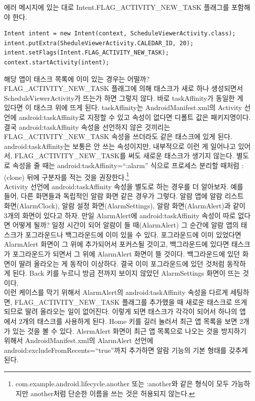 에러 메시지에 있는 대로 Intent.FLAG\_ACTIVITY\_NEW\_TASK 플래그를 포함해야 한다.
\begin{lstlisting}[frame=single]
Intent intent = new Intent(context, ScheduleViewerActivity.class);
intent.putExtra(SheduleViewerActivity.CALEDAR_ID, 20);
intent.setFlags(Intent.FLAG_ACTIVITY_NEW_TASK);
context.startActivity(intent);
\end{lstlisting}

해당 앱이 태스크 목록에 이미 있는 경우는 어떨까? FLAG\_ACTIVITY\_NEW\_TASK 플래그에 의해 태스크가 새로 하나 생성되면서 ScheduleViewerActivity가 뜨는가 하면 그렇지 않다. 
바로 taskAffinity가 동일한 게 있다면 이 태스크 위에 뜨게 된다. 
taskAffinity는 AndroidManifest.xml의 Activity 선언에 android:taskAffinity로 지정할 수 있고 속성이 없다면 디폴트 값은 패키지명이다.
결국 android:taskAffinity 속성을 선언하지 않은 것끼리는 FLAG\_ACTIVITY\_N\-EW\_TASK 속성을 쓰더라도 같은 태스크에 있게 된다.
android:taskAffinity는 보통은 안 쓰는 속성이지만, 내부적으로 이런 게 일어나고 있어서, FLAG\_ACTIVITY\_N\-EW\_TASK를 써도 새로운 태스크가 생기지 않는다.
별도로 속성을 줄 때는 android:taskAffinity=``:alarm'' 식으로 프로세스 분리할 때처럼 :(clone) 뒤에 구분자를 적는 것을 권장한다.\footnote{com.example.android.lifecycle.another 또는 :another와 같은 형식이 모두 가능하지만  another처럼 단순한 이름을 쓰는 것은 허용되지 않는다.}\\

Activity 선언에 android:taskAffinity 속성을 별도로 하는 경우를 더 알아보자. 예를 들어, 다른 화면들과 독립적인 알람 화면 같은 경우가 그렇다. 
알람 앱에 알람 리스트 화면(AlarmClock), 알람 설정 화면(AlarmSettings), 알람 화면(AlarmAlert)과 같이 3개의 화면이 있다고 하자. 
만일 AlarmAlert에 android:taskAffinity 속성이 따로 없다면 어떻게 될까?
일정 시간이 되어 알람이 들 때(AlarmAlert) 그 순간에 알람 앱의 태스크가 포그라운드나 백그라운드에 이미 있을 수 있다. 
포그라운드에 이미 있었다면 AlarmAlert 화면이 그 위에 추가되어서 포커스될 것이고, 백그라운드에 있다면 태스크가 포그라운드가 되면서 그 위에 AlarmAlert 화면이 뜰 것이다.  
백그라운드에 있던 화면이 딸려 올라오는 게 동작이 이상하다. 결국 이미 포그라운드에 있던 것처럼 동작하게 된다. Back 키를 누르니 방금 전까지 보이지 않았던 AlarmSettings 화면이 뜨는 것이다.\\

이런 케이스를 막기 위해서 AlarmAlert의 android:taskAffinity 속성을 다르게 세팅하면, FLAG\_AC\-TIVITY\-\_NEW\_TASK 플래그를 추가했을 때 새로운 태스크로 뜨게 되므로 딸려 올라오는 일이 없어진다. 이렇게 되면 태스크가 각각이 되어서 하나의 앱에서 2개의 태스크를 사용하게 된다.
Home 키를 길러 눌러서 최근 앱 목록을 보면 2개가 있는 것을 볼 수 있다. AlermAlert 화면이 최근 앱 목록으로 나오는 것을 방지하기 위해서 AndroidManifest.xml의 AlarmAlert 선언에 android:excludeFromRecents=``true''까지 추가하면 알람 기능의 기본 형태를 갖추게 된다.


